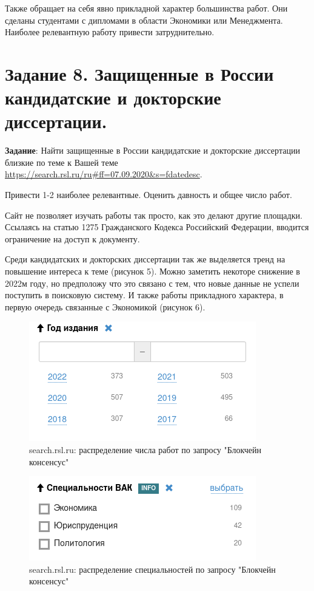 \documentclass[a4paper, 12pt]{report}		%
\begin{document}
Также обращает на себя явно прикладной характер большинства работ. Они сделаны студентами с дипломами в области Экономики или Менеджмента. Наиболее релевантную работу привести затруднительно.


\chapter*{Задание 8. Защищенные в России кандидатские и докторские диссертации.}


\textbf{Задание}: Найти защищенные в России кандидатские и докторские диссертации близкие по теме к Вашей теме \url{https://search.rsl.ru/ru#ff=07.09.2020&s=fdatedesc}.


Привести 1-2 наиболее релевантные. Оценить давность и общее число работ.


\vspace{1cm}


Сайт не позволяет изучать работы так просто, как это делают другие площадки. Ссылаясь на статью 1275 Гражданского Кодекса Российский Федерации, вводится ограничение на доступ к документу.


Среди кандидатских и докторских диссертации так же выделяется тренд на повышение интереса к теме (рисунок 5). Можно заметить некоторе снижение в 2022м году, но предположу что это связано с тем, что новые данные не успели поступить в поисковую систему. И также работы прикладного характера, в первую очередь связанные с Экономикой (рисунок 6).


\begin{figure}[H]
 \centering
 \includegraphics[scale=0.6]{res/rsl1}
 \caption{search.rsl.ru: распределение числа работ по запросу "Блокчейн консенсус"}
\end{figure}


\begin{figure}[H]
 \centering
 \includegraphics[scale=0.6]{res/rsl2}
 \caption{search.rsl.ru: распределение специальностей по запросу "Блокчейн консенсус"}
\end{figure}
\end{document}
